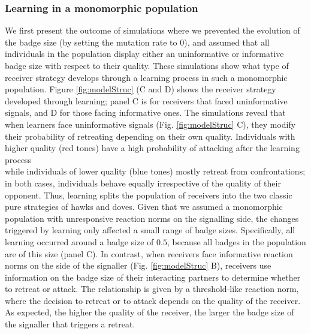 \documentclass[
  12pt,
]{article}
\begin{document}
\hypertarget{learning-in-a-monomorphic-population}{%
\subsubsection{Learning in a monomorphic
population}\label{learning-in-a-monomorphic-population}}

We first present the outcome of simulations where we prevented the
evolution of the badge size (by setting the mutation rate to \(0\)), and
assumed that all individuals in the population display either an
uninformative or informative badge size with respect to their quality.
These simulations show what type of receiver strategy develops through a
learning process in such a monomorphic population. Figure
\ref{fig:modelStruc} (C and D) shows the receiver strategy developed
through learning; panel C is for receivers that faced uninformative
signals, and D for those facing informative ones. The simulations reveal
that when learners face uninformative signals (Fig. \ref{fig:modelStruc}
C), they modify their probability of retreating depending on their own
quality. Individuals with higher quality (red tones) have a high
probability of attacking after the learning process\\
while individuals of lower quality (blue tones) mostly retreat from
confrontations; in both cases, individuals behave equally irrespective
of the quality of their opponent. Thus, learning splits the population
of receivers into the two classic pure strategies of hawks and doves.
Given that we assumed a monomorphic population with unresponsive
reaction norms on the signalling side, the changes triggered by learning
only affected a small range of badge sizes. Specifically, all learning
occurred around a badge size of \(0.5\), because all badges in the
population are of this size (panel C). In contrast, when receivers face
informative reaction norms on the side of the signaller (Fig.
\ref{fig:modelStruc} B), receivers use information on the badge size of
their interacting partners to determine whether to retreat or attack.
The relationship is given by a threshold-like reaction norm, where the
decision to retreat or to attack depends on the quality of the receiver.
As expected, the higher the quality of the receiver, the larger the
badge size of the signaller that triggers a retreat.
\end{document}
